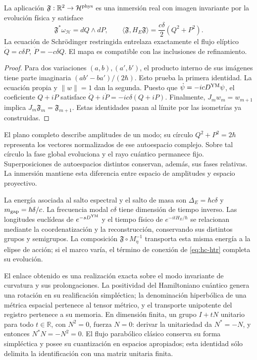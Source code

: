 \begin{theorem}
\label{thm:hc-ym-oscillator}
La aplicación \(\mathfrak F:\mathbb R^2\to\mathcal H^{\rm phys}\)
es una inmersión real con imagen invariante por la evolución física y
satisface
\begin{equation}
 \mathfrak F^*\omega_{\mathcal H}=dQ\wedge dP,
 \qquad
 \langle\mathfrak F,H_E\mathfrak F\rangle
 =\frac{c\delta}{2}(Q^2+P^2).
 \label{eq:hc-ym-energy-pullback}
\end{equation}
La ecuación de Schrödinger restringida entrelaza exactamente el flujo
elíptico \(\dot Q=c\delta P,\ \dot P=-c\delta Q\).
El mapa es compatible con las inclusiones de refinamiento.
\end{theorem}
\begin{proof}
Para dos variaciones \((a,b),(a',b')\), el producto interno de sus
imágenes tiene parte imaginaria \((ab'-ba')/(2\hbar)\).
Esto prueba la primera identidad. La ecuación propia y \(\|w\|=1\)
dan la segunda. Puesto que
\(\dot\psi=-icD^{\rm YM}\psi\), el coeficiente \(Q+iP\)
satisface \(\dot Q+i\dot P=-ic\delta(Q+iP)\).
Finalmente, \(J_mw_m=w_{m+1}\) implica
\(J_m\mathfrak F_m=\mathfrak F_{m+1}\). Estas identidades pasan al
límite por las isometrías ya construidas.
\end{proof}

El plano completo describe amplitudes de un modo; su círculo
\(Q^2+P^2=2\hbar\) representa los vectores normalizados de ese
autoespacio complejo. Sobre tal círculo la fase global evoluciona y el
rayo cuántico permanece fijo. Superposiciones de autoespacios distintos
conservan, además, sus fases relativas. La inmersión mantiene esta
diferencia entre espacio de amplitudes y espacio proyectivo.

La energía asociada al salto espectral y el salto de masa son
\(\Delta_E=\hbar c\delta\) y \(m_{\rm gap}=\hbar\delta/c\).
La frecuencia modal \(c\delta\) tiene dimensión de tiempo inverso.
Las longitudes euclídeas de \(e^{-sD^{\rm YM}}\) y el tiempo físico
de \(e^{-itH_E/\hbar}\) se relacionan mediante la coordenatización y la
reconstrucción, conservando sus distintos grupos y semigrupos.
La composición \(\mathfrak F\circ M_\eta^{-1}\) transporta esta
misma energía a la elipse de acción; si el marco varía, el término de
conexión de \eqref{eq:hc-htr} completa su evolución.

El enlace obtenido es una realización exacta sobre el modo invariante de
curvatura y sus prolongaciones. La positividad del Hamiltoniano cuántico
genera una rotación en su realificación simpléctica; la denominación
hiperbólica de una métrica espacial pertenece al tensor métrico, y el
transporte unipotente del registro pertenece a su memoria. En dimensión
finita, un grupo \(I+tN\) unitario para todo \(t\in\mathbb R\), con
\(N^2=0\), fuerza \(N=0\): derivar la unitariedad da \(N^*=-N\),
y entonces \(N^*N=-N^2=0\). El flujo parabólico clásico conserva su
forma simpléctica y posee su cuantización en espacios apropiados; esta
identidad sólo delimita la identificación con una matriz unitaria finita.

